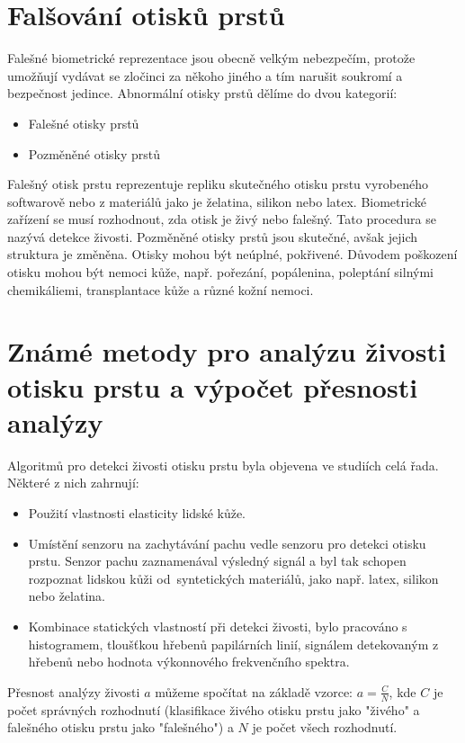 \section{Falšování otisků prstů}
Falešné biometrické reprezentace jsou obecně velkým nebezpečím, protože umožňují vydávat se zločinci za někoho jiného a tím narušit soukromí a bezpečnost jedince. Abnormální otisky prstů dělíme do dvou kategorií:
\begin{itemize}
    \item Falešné otisky prstů
    \item Pozměněné otisky prstů
\end{itemize}
Falešný otisk prstu reprezentuje repliku skutečného otisku prstu vyrobeného softwarově nebo z materiálů jako je želatina, silikon nebo latex. Biometrické zařízení se musí rozhodnout, zda otisk je živý nebo falešný. Tato procedura se nazývá detekce živosti.
Pozměněné otisky prstů jsou skutečné, avšak jejich struktura je změněna. Otisky mohou být neúplné, pokřivené. Důvodem poškození otisku mohou být nemoci kůže, např. pořezání, popálenina, poleptání silnými chemikáliemi, transplantace kůže a různé kožní nemoci.\cite{Petrovici}
\section{Známé metody pro analýzu živosti otisku prstu a výpočet přesnosti analýzy}
Algoritmů pro detekci živosti otisku prstu byla objevena ve studiích celá řada. Některé z nich zahrnují:\cite{AbhiskekStudy}
\begin{itemize}
    \item Použití vlastnosti elasticity lidské kůže.
    \item Umístění senzoru na zachytávání pachu vedle senzoru pro detekci otisku prstu. Senzor pachu zaznamenával výsledný signál a byl tak schopen rozpoznat lidskou kůži od~syntetických materiálů, jako např. latex, silikon nebo želatina.
    \item Kombinace statických vlastností při detekci živosti, bylo pracováno s histogramem, tloušťkou hřebenů papilárních linií, signálem detekovaným z hřebenů nebo hodnota výkonnového frekvenčního spektra.
    
\end{itemize}

Přesnost analýzy živosti $a$ můžeme spočítat na základě vzorce:
$a = \frac{C}{N}$, kde $C$ je počet správných rozhodnutí (klasifikace živého otisku prstu jako "živého" a falešného otisku prstu jako "falešného") a $N$ je počet všech rozhodnutí.\cite{GottschlichStudy}

